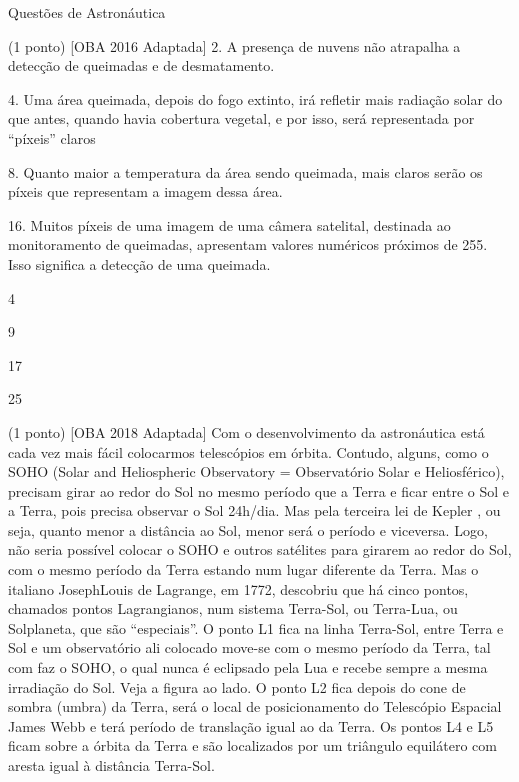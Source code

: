 \documentclass{../lista}
\begin{document}
\begin{secao}{Questões de Astronáutica}
\begin{questao}{(1 ponto) [OBA 2016 Adaptada]}
			2. A presença de nuvens não atrapalha a detecção de queimadas e de desmatamento.
			
			4. Uma área queimada, depois do fogo extinto, irá refletir mais radiação solar do que antes, quando havia cobertura vegetal, e por isso, será representada por “píxeis” claros
			
			8. Quanto maior a temperatura da área sendo queimada, mais claros serão os píxeis que representam a imagem dessa área.
			
			16. Muitos píxeis de uma imagem de uma câmera satelital, destinada ao monitoramento de queimadas, apresentam valores numéricos próximos de 255. Isso significa a detecção de uma queimada.
			
			\begin{alternativas}
				\item 4
				\item 9
				\item 17
				\item 25
			\end{alternativas}
		\end{questao}

		\begin{questao}{(1 ponto) [OBA 2018 Adaptada]}
			Com o desenvolvimento da astronáutica está cada vez mais fácil colocarmos telescópios em órbita. Contudo, alguns, como o SOHO (Solar and Heliospheric Observatory = Observatório Solar e Heliosférico), precisam girar ao redor do Sol no mesmo período que a Terra e ficar entre o Sol e a Terra, pois precisa observar o Sol 24h/dia. Mas pela terceira lei de Kepler , ou seja, quanto menor a distância ao Sol, menor será o período e viceversa. Logo, não seria possível colocar o SOHO e outros satélites para girarem ao redor do Sol, com o mesmo período da Terra estando num lugar diferente da Terra. Mas o italiano JosephLouis de Lagrange, em 1772, descobriu que há cinco pontos, chamados pontos Lagrangianos, num sistema Terra-Sol, ou Terra-Lua, ou Solplaneta, que são “especiais”. O ponto L1 fica na linha Terra-Sol, entre Terra e Sol e um observatório ali colocado move-se com o mesmo período da Terra, tal com faz o SOHO, o qual nunca é eclipsado pela Lua e recebe sempre a mesma irradiação do Sol. Veja a figura ao lado. O ponto L2 fica depois do cone de sombra (umbra) da Terra, será o local de posicionamento do Telescópio Espacial James Webb e terá período de translação igual ao da Terra. Os pontos L4 e L5 ficam sobre a órbita da Terra e são localizados por um triângulo equilátero com aresta igual à distância Terra-Sol.
			

\end{questao}
\end{secao}
\end{document}
